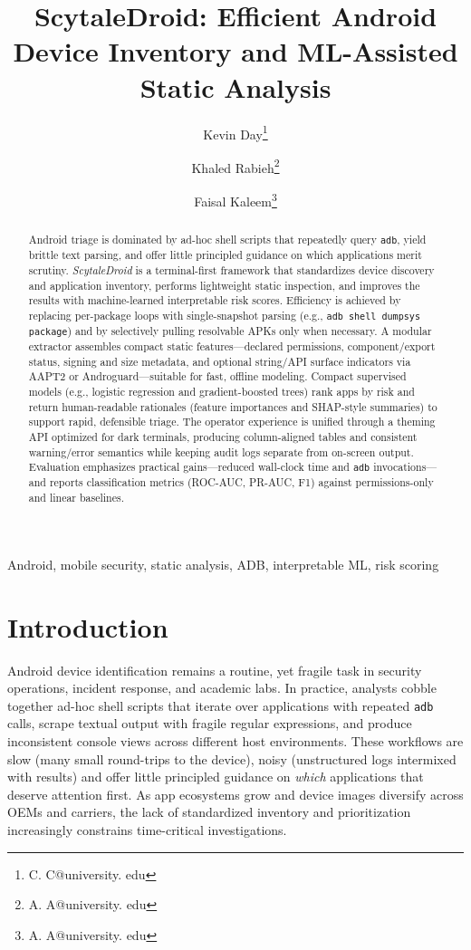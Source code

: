 \documentclass[10pt,conference]{IEEEtran}
\title{ScytaleDroid: Efficient Android Device Inventory and ML-Assisted Static Analysis}
\author[1]{Kevin Day\thanks{C. C@university. edu}}
\author[1]{Khaled Rabieh\thanks{A. A@university. edu}}
\author[1]{Faisal Kaleem\thanks{A. A@university. edu}}
\affil[1]{Department of Computer Science and Cybersecurity, Metro State University, Saint Paul, MN 55106 USA}
\makeatletter
\newcommand{\PaperNumber}[1]{\gdef\@papernumber{#1}}
\gdef\@papernumber{} %
\makeatother
\begin{document}

\maketitle
\thispagestyle{empty}      %
\pagestyle{ieeehead}       %

\begin{abstract}
Android triage is dominated by ad-hoc shell scripts that repeatedly query \texttt{adb}, yield brittle text parsing, and offer little principled guidance on which applications merit scrutiny. \emph{ScytaleDroid} is a terminal-first framework that standardizes device discovery and application inventory, performs lightweight static inspection, and improves the results with machine-learned interpretable risk scores. Efficiency is achieved by replacing per-package loops with single-snapshot parsing (e.g., \texttt{adb shell dumpsys package}) and by selectively pulling resolvable APKs only when necessary. A modular extractor assembles compact static features—declared permissions, component/export status, signing and size metadata, and optional string/API surface indicators via AAPT2 or Androguard—suitable for fast, offline modeling. Compact supervised models (e.g., logistic regression and gradient-boosted trees) rank apps by risk and return human-readable rationales (feature importances and SHAP-style summaries) to support rapid, defensible triage. The operator experience is unified through a theming API optimized for dark terminals, producing column-aligned tables and consistent warning/error semantics while keeping audit logs separate from on-screen output. Evaluation emphasizes practical gains—reduced wall-clock time and \texttt{adb} invocations—and reports classification metrics (ROC-AUC, PR-AUC, F1) against permissions-only and linear baselines.
\end{abstract}

\begin{IEEEkeywords}
Android, mobile security, static analysis, ADB, interpretable ML, risk scoring
\end{IEEEkeywords}

\section{Introduction}\label{sec:intro}
Android device identification remains a routine, yet fragile task in security operations, incident response, and academic labs. In practice, analysts cobble together ad-hoc shell scripts that iterate over applications with repeated \texttt{adb} calls, scrape textual output with fragile regular expressions, and produce inconsistent console views across different host environments. These workflows are slow (many small round-trips to the device), noisy (unstructured logs intermixed with results) and offer little principled guidance on \emph{which} applications that deserve attention first. As app ecosystems grow and device images diversify across OEMs and carriers, the lack of standardized inventory and prioritization increasingly constrains time-critical investigations.
\end{document}
